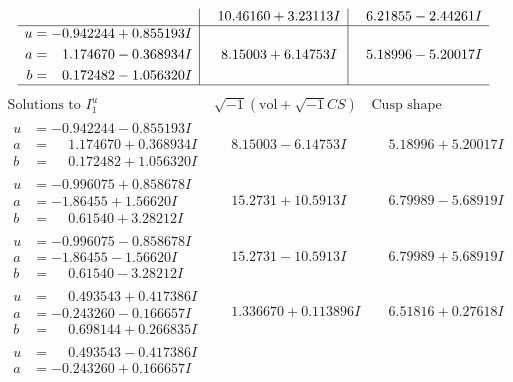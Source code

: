 \documentclass[1p]{elsarticle_modified}
\theoremstyle{definition}
\newcommand{\I}{\sqrt{-1}}
\begin{document}
$$\begin{array}{c|c|c}
 & \phantom{-}10.46160 + 3.23113 I & \phantom{-}6.21855 - 2.44261 I \\ \hline\begin{aligned}
u &= -0.942244 + 0.855193 I \\
a &= \phantom{-}1.174670 - 0.368934 I \\
b &= \phantom{-}0.172482 - 1.056320 I\end{aligned}
 & \phantom{-}8.15003 + 6.14753 I & \phantom{-}5.18996 - 5.20017 I\\
 \hline 
 \end{array}$$\newpage$$\begin{array}{c|c|c}  
\text{Solutions to }I^u_{1}& \I (\text{vol} + \sqrt{-1}CS) & \text{Cusp shape}\\
 \hline 
\begin{aligned}
u &= -0.942244 - 0.855193 I \\
a &= \phantom{-}1.174670 + 0.368934 I \\
b &= \phantom{-}0.172482 + 1.056320 I\end{aligned}
 & \phantom{-}8.15003 - 6.14753 I & \phantom{-}5.18996 + 5.20017 I \\ \hline\begin{aligned}
u &= -0.996075 + 0.858678 I \\
a &= -1.86455 + 1.56620 I \\
b &= \phantom{-}0.61540 + 3.28212 I\end{aligned}
 & \phantom{-}15.2731 + 10.5913 I & \phantom{-}6.79989 - 5.68919 I \\ \hline\begin{aligned}
u &= -0.996075 - 0.858678 I \\
a &= -1.86455 - 1.56620 I \\
b &= \phantom{-}0.61540 - 3.28212 I\end{aligned}
 & \phantom{-}15.2731 - 10.5913 I & \phantom{-}6.79989 + 5.68919 I \\ \hline\begin{aligned}
u &= \phantom{-}0.493543 + 0.417386 I \\
a &= -0.243260 - 0.166657 I \\
b &= \phantom{-}0.698144 + 0.266835 I\end{aligned}
 & \phantom{-}1.336670 + 0.113896 I & \phantom{-}6.51816 + 0.27618 I \\ \hline\begin{aligned}
u &= \phantom{-}0.493543 - 0.417386 I \\
a &= -0.243260 + 0.166657 I \\

\end{aligned}
\end{array}$$
\end{document}
